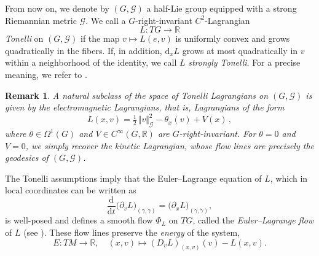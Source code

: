 \documentclass[11pt,reqno]{amsart}
\theoremstyle{plain}
\newtheorem{rem}[thm]{Remark}
\theoremstyle{definition}
\theoremstyle{plain} %
\newtheorem{rem}[rem]{Remark}
\theoremstyle{definition} %
\numberwithin{equation}{section}
\def\d{\delta}
\def\d{\delta}
\def\RR{{\mathbb R}}
\def\d{{\mathrm{d}}}
\begin{document}
From now on, we denote by \( (G, \mathcal{G}) \) a half-Lie group equipped with a strong Riemannian metric \( \mathcal{G} \). 
We call a $G$-right-invariant $C^2$-Lagrangian  
\[
L \colon TG \to \mathbb{R}
\]
\emph{Tonelli} on \( (G, \mathcal{G}) \) if the map \( v \mapsto L(e,v) \) is uniformly convex and grows quadratically in the fibers.
If, in addition, $\d_x L$ grows at most quadratically in $v$ within a neighborhood of the identity, we call $L$ \emph{strongly Tonelli}. 
For a precise meaning, we refer to .
\begin{rem}\label{rem: intro magnetic Langrang are Tonelli int}
A natural subclass of the space of Tonelli Lagrangians on $(G,\mathcal{G})$ is given by the electromagnetic Lagrangians, that is, Lagrangians of the form  
\begin{equation}\label{eq: electromagnetic lagrangians int}
    L(x,v) = \tfrac{1}{2}\,\Vert v\Vert^2_{\mathcal{G}} - \theta_x(v) + V(x)\, ,
\end{equation}
where $\theta \in \Omega^1(G)$ and $V \in C^{\infty}(G,\RR)$ are $G$-right-invariant. For $\theta = 0$ and $V = 0$, we simply recover the kinetic Lagrangian, whose flow lines are precisely the geodesics of $(G,\mathcal{G})$.
\end{rem}

The Tonelli assumptions imply that the Euler–Lagrange equation of \( L \), which in local coordinates can be written as
\begin{equation}\label{eq: ELE}
    \frac{\mathrm{d}}{\mathrm{d}t} \big(\partial_v L\big)_{(\gamma, \dot{\gamma})}
    = \big(\partial_x L\big)_{(\gamma, \dot{\gamma})},
\end{equation} 
is well-posed and defines a smooth flow \( \Phi_L \) on \( TG \), called the \emph{Euler–Lagrange flow} of \( L \) (see ). 
These flow lines preserve the \emph{energy} of the system,
\begin{equation}\label{eq:energy}
    E \colon TM \to \mathbb{R}, \quad (x, v) \longmapsto (D_v L)_{(x, v)}(v) - L(x, v).
\end{equation}
\end{document}
